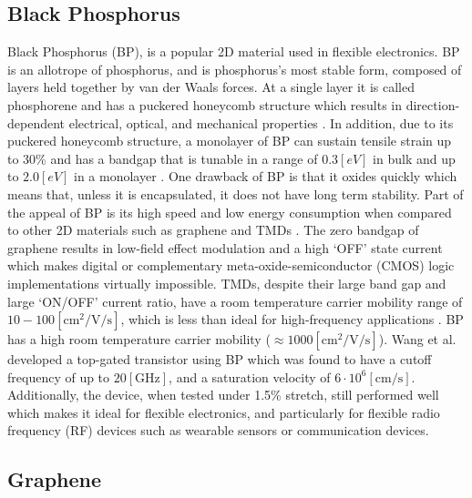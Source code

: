 \documentclass[conference]{IEEEtran}
\begin{document}
\subsection{Black Phosphorus}

Black Phosphorus (BP), is a popular 2D material used in flexible electronics. BP is an allotrope of phosphorus, and is phosphorus's most stable form, composed of layers held together by van der Waals forces. At a single layer it is called phosphorene and has a puckered honeycomb structure which results in direction-dependent electrical, optical, and mechanical properties \cite{tc2,tc3}. In addition, due to its puckered honeycomb structure, a monolayer of BP can sustain tensile strain up to 30\% and has a bandgap that is tunable in a range of $0.3[\si{eV}]$ in bulk and up to $2.0[\si{eV}]$ in a monolayer \cite{tc3}. One drawback of BP is that it oxides quickly which means that, unless it is encapsulated, it does not have long term stability. Part of the appeal of BP is its high speed and low energy consumption when compared to other 2D materials such as graphene and TMDs \cite{tc2}. The zero bandgap of graphene results in low-field effect modulation and a high `\textsc{OFF}' state current which makes digital or complementary meta-oxide-semiconductor (CMOS) logic implementations virtually impossible. TMDs, despite their large band gap and large `\textsc{ON/OFF}' current ratio, have a room temperature carrier mobility range of $10-100[\si{\centi\meter\squared\per\volt\per\second}]$, which is less than ideal for high-frequency applications \cite{tc4}. BP has a high room temperature carrier mobility ($\approx1000[\si{\centi\meter\squared\per\volt\per\second}]$). Wang et al. \cite{tc4} developed a top-gated transistor using BP which was found to have a cutoff frequency of up to $20[\si{\giga\hertz}]$, and a saturation velocity of $6\cdot10^6[\si{\centi\meter\per\second}]$. Additionally, the device, when tested under 1.5\% stretch, still performed well which makes it ideal for flexible electronics, and particularly for flexible radio frequency (RF) devices such as wearable sensors or communication devices.

\subsection{Graphene}
\end{document}
